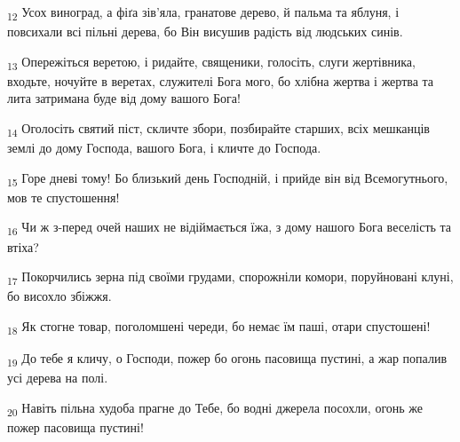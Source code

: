 \begin{tcolorbox}
\textsubscript{12} Усох виноград, а фіґа зів'яла, гранатове дерево, й пальма та яблуня, і повсихали всі пільні дерева, бо Він висушив радість від людських синів.
\end{tcolorbox}
\begin{tcolorbox}
\textsubscript{13} Опережіться веретою, і ридайте, священики, голосіть, слуги жертівника, входьте, ночуйте в веретах, служителі Бога мого, бо хлібна жертва і жертва та лита затримана буде від дому вашого Бога!
\end{tcolorbox}
\begin{tcolorbox}
\textsubscript{14} Оголосіть святий піст, скличте збори, позбирайте старших, всіх мешканців землі до дому Господа, вашого Бога, і кличте до Господа.
\end{tcolorbox}
\begin{tcolorbox}
\textsubscript{15} Горе дневі тому! Бо близький день Господній, і прийде він від Всемогутнього, мов те спустошення!
\end{tcolorbox}
\begin{tcolorbox}
\textsubscript{16} Чи ж з-перед очей наших не відіймається їжа, з дому нашого Бога веселість та втіха?
\end{tcolorbox}
\begin{tcolorbox}
\textsubscript{17} Покорчились зерна під своїми грудами, спорожніли комори, поруйновані клуні, бо висохло збіжжя.
\end{tcolorbox}
\begin{tcolorbox}
\textsubscript{18} Як стогне товар, поголомшені череди, бо немає їм паші, отари спустошені!
\end{tcolorbox}
\begin{tcolorbox}
\textsubscript{19} До тебе я кличу, о Господи, пожер бо огонь пасовища пустині, а жар попалив усі дерева на полі.
\end{tcolorbox}
\begin{tcolorbox}
\textsubscript{20} Навіть пільна худоба прагне до Тебе, бо водні джерела посохли, огонь же пожер пасовища пустині!
\end{tcolorbox}
